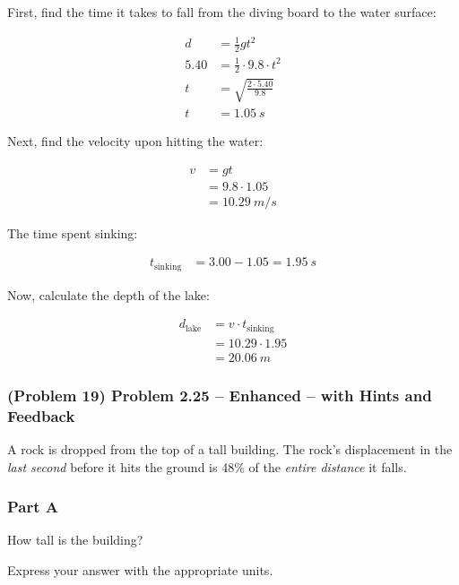 \begin{solution}
	First, find the time it takes to fall from the diving board to the water surface:

	\begin{align*}
		d &= \frac{1}{2} g t^2 \\
		5.40 &= \frac{1}{2} \cdot 9.8 \cdot t^2 \\
		t &= \sqrt{\frac{2 \cdot 5.40}{9.8}} \\
		t &= \SI{1.05}{s}
	\end{align*}

	Next, find the velocity upon hitting the water:

	\begin{align*}
		v &= g t \\
		&= 9.8 \cdot 1.05 \\
		&= \SI{10.29}{m/s}
	\end{align*}

	The time spent sinking:

	\begin{align*}
		t_{\mathrm{sinking}} &= 3.00 - 1.05 = \SI{1.95}{s}
	\end{align*}

	Now, calculate the depth of the lake:

	\begin{align*}
		d_{\mathrm{lake}} &= v \cdot t_{\mathrm{sinking}} \\
		&= 10.29 \cdot 1.95 \\
		&= \boxed{\SI{20.06}{m}}
	\end{align*}
\end{solution}

\newpage

\subsubsection{(Problem 19) Problem 2.25 -- Enhanced -- with Hints and Feedback}

A rock is dropped from the top of a tall building. The rock's displacement in the \emph{last second} before it hits the ground is 48\% of the \emph{entire distance} it falls.

\subsubsection{Part A}
How tall is the building?

Express your answer with the appropriate units.

